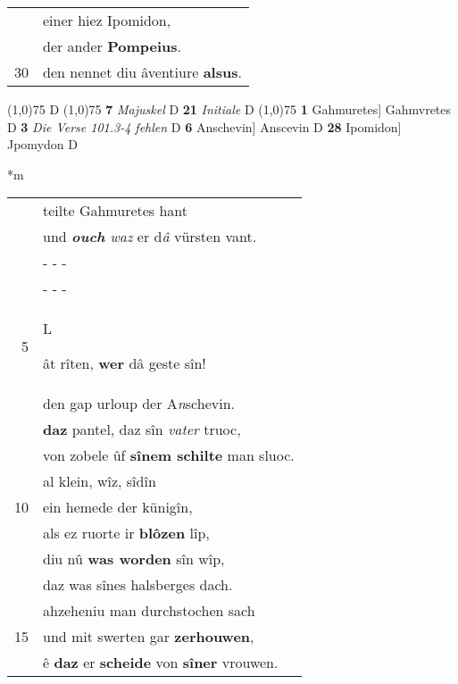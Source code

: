 \documentclass[8pt,a4paper,notitlepage]{article}
\begin{document}
\begin{table}[ht]
\begin{minipage}[t]{0.5\linewidth}
\begin{tabular}{rl}
 & einer hiez Ipomidon,\\ 
 & der ander \textbf{Pompeius}.\\ 
30 & den nennet diu âventiure \textbf{alsus}.\\ 
\end{tabular}
\scriptsize
\line(1,0){75} \newline
D \newline
\line(1,0){75} \newline
\textbf{7} \textit{Majuskel} D  \textbf{21} \textit{Initiale} D  \newline
\line(1,0){75} \newline
\textbf{1} Gahmuretes] Gahmvretes D \textbf{3} \textit{Die Verse 101.3-4 fehlen} D  \textbf{6} Anschevin] Anscevin D \textbf{28} Ipomidon] Jpomydon D \newline
\end{minipage}
\hspace{0.5cm}
\begin{minipage}[t]{0.5\linewidth}
\small
\begin{center}*m
\end{center}
\begin{tabular}{rl}
 & teilte Gahmuretes hant\\ 
 & und \textit{\textbf{ouch} waz} er d\textit{â} vürsten vant.\\ 
 & \multicolumn{1}{l}{ - - - }\\ 
 & \multicolumn{1}{l}{ - - - }\\ 
5 & \begin{large}L\end{large}ât rîten, \textbf{wer} dâ geste sîn!\\ 
 & den gap urloup der A\textit{n}schevin.\\ 
 & \textbf{daz} pantel, daz sîn \textit{vater} truoc,\\ 
 & von zobele ûf \textbf{sînem schilte} man sluoc.\\ 
 & al klein, wîz, sîdîn\\ 
10 & ein hemede der künigîn,\\ 
 & als ez ruorte ir \textbf{blôzen} lîp,\\ 
 & diu nû \textbf{was worden} sîn wîp,\\ 
 & daz was sînes halsberges dach.\\ 
 & ahzeheniu man durchstochen sach\\ 
15 & und mit swerten gar \textbf{zerhouwen},\\ 
 & ê \textbf{daz} er \textbf{scheide} von \textbf{sîner} vrouwen.\\ 

\end{tabular}
\end{minipage}
\end{table}
\end{document}
